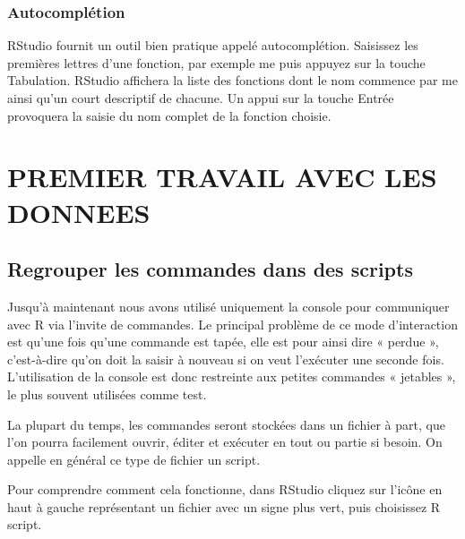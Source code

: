 \documentclass[
]{book}
\begin{document}
\hypertarget{autocompluxe9tion}{%
\subsection{Autocomplétion}\label{autocompluxe9tion}}

RStudio fournit un outil bien pratique appelé autocomplétion. Saisissez les premières lettres d'une fonction, par exemple me puis appuyez sur la touche Tabulation. RStudio affichera la liste des fonctions dont le nom commence par me ainsi qu'un court descriptif de chacune. Un appui sur la touche Entrée provoquera la saisie du nom complet de la fonction choisie.

\hypertarget{premier-travail-avec-les-donnees}{%
\chapter{PREMIER TRAVAIL AVEC LES DONNEES}\label{premier-travail-avec-les-donnees}}

\hypertarget{regrouper-les-commandes-dans-des-scripts}{%
\section{Regrouper les commandes dans des scripts}\label{regrouper-les-commandes-dans-des-scripts}}

Jusqu'à maintenant nous avons utilisé uniquement la console pour communiquer avec R via l'invite de commandes. Le principal problème de ce mode d'interaction est qu'une fois qu'une commande est tapée, elle est pour ainsi dire « perdue », c'est-à-dire qu'on doit la saisir à nouveau si on veut l'exécuter une seconde fois. L'utilisation de la console est donc restreinte aux petites commandes « jetables », le plus souvent utilisées comme test.

La plupart du temps, les commandes seront stockées dans un fichier à part, que l'on pourra facilement ouvrir, éditer et exécuter en tout ou partie si besoin. On appelle en général ce type de fichier un script.

Pour comprendre comment cela fonctionne, dans RStudio cliquez sur l'icône en haut à gauche représentant un fichier avec un signe plus vert, puis choisissez R script.
\end{document}
